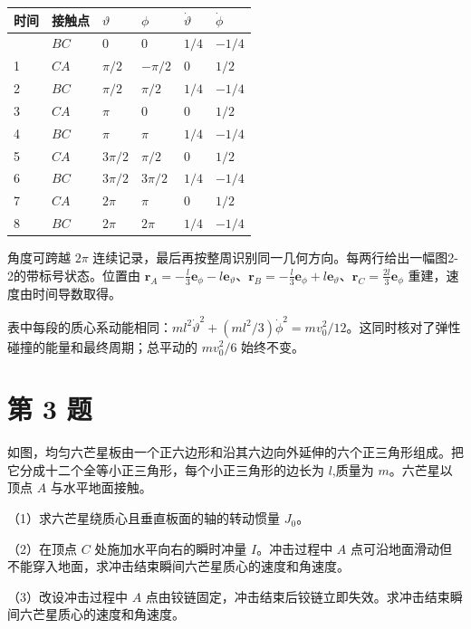 \documentclass[12pt,a4paper,UTF8]{ctexart}
\newcounter{none}
\begin{document}
{\def\LTcaptype{none} %
\begin{longtable}[]{@{}llllll@{}}
\toprule\noalign{}
时间 & 接触点 & \(\vartheta\) & \(\phi\) & \(\dot\vartheta\) &
\(\dot\phi\) \\
\midrule\noalign{}
\endhead
\bottomrule\noalign{}
\endlastfoot
0 & \(BC\) & 0 & 0 & \(1/4\) & \(-1/4\) \\
1 & \(CA\) & \(\pi/2\) & \(-\pi/2\) & 0 & \(1/2\) \\
2 & \(BC\) & \(\pi/2\) & \(\pi/2\) & \(1/4\) & \(-1/4\) \\
3 & \(CA\) & \(\pi\) & 0 & 0 & \(1/2\) \\
4 & \(BC\) & \(\pi\) & \(\pi\) & \(1/4\) & \(-1/4\) \\
5 & \(CA\) & \(3\pi/2\) & \(\pi/2\) & 0 & \(1/2\) \\
6 & \(BC\) & \(3\pi/2\) & \(3\pi/2\) & \(1/4\) & \(-1/4\) \\
7 & \(CA\) & \(2\pi\) & \(\pi\) & 0 & \(1/2\) \\
8 & \(BC\) & \(2\pi\) & \(2\pi\) & \(1/4\) & \(-1/4\) \\
\end{longtable}
}

角度可跨越 \(2\pi\)
连续记录，最后再按整周识别同一几何方向。每两行给出一幅图2-2的带标号状态。位置由
\(\bm r_A=-\tfrac l3\bm e_\phi-l\bm e_\vartheta\)、\(\bm r_B=-\tfrac l3\bm e_\phi+l\bm e_\vartheta\)、\(\bm r_C=\tfrac{2l}3\bm e_\phi\)
重建，速度由时间导数取得。

表中每段的质心系动能相同：\(ml^2\dot\vartheta^2+(ml^2/3)\dot\phi^2=mv_0^2/12\)。这同时核对了弹性碰撞的能量和最终周期；总平动的
\(mv_0^2/6\) 始终不变。

\newpage

\section{第 3 题}\label{ux7b2c-3-ux9898}

如图，均匀六芒星板由一个正六边形和沿其六边向外延伸的六个正三角形组成。把它分成十二个全等小正三角形，每个小正三角形的边长为
\(l\),质量为 \(m\)。六芒星以顶点 \(A\) 与水平地面接触。

（1）求六芒星绕质心且垂直板面的轴的转动惯量 \(J_0\)。

（2）在顶点 \(C\) 处施加水平向右的瞬时冲量 \(I\)。冲击过程中 \(A\)
点可沿地面滑动但不能穿入地面，求冲击结束瞬间六芒星质心的速度和角速度。

（3）改设冲击过程中 \(A\)
点由铰链固定，冲击结束后铰链立即失效。求冲击结束瞬间六芒星质心的速度和角速度。
\end{document}
